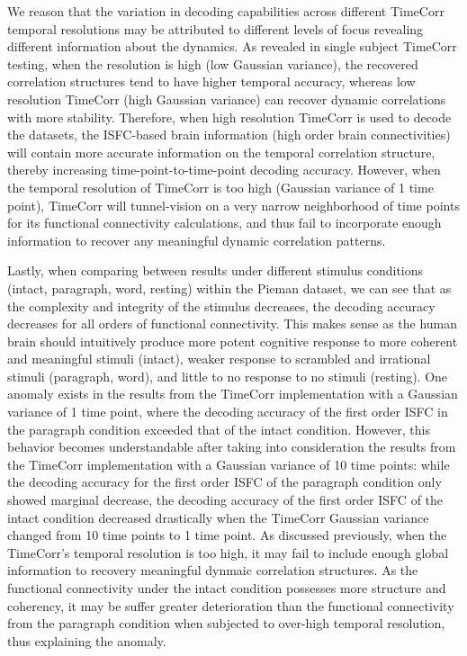 \documentclass[11pt]{article}
\begin{document}
We reason that the variation in decoding capabilities across different TimeCorr temporal resolutions may be attributed to different levels of focus revealing different information about the dynamics. As revealed in single subject TimeCorr testing, when the resolution is high (low Gaussian variance), the recovered correlation structures tend to have higher temporal accuracy, whereas low resolution TimeCorr (high Gaussian variance) can recover dynamic correlations with more stability. Therefore, when high resolution TimeCorr is used to decode the datasets, the ISFC-based brain information (high order brain connectivities) will contain more accurate information on the temporal correlation structure, thereby increasing time-point-to-time-point decoding accuracy. However, when the temporal resolution of TimeCorr is too high (Gaussian variance of 1 time point), TimeCorr will tunnel-vision on a very narrow neighborhood of time points for its functional connectivity calculations, and thus fail to incorporate enough information to recover any meaningful dynamic correlation patterns.

Lastly, when comparing between results under different stimulus conditions (intact, paragraph, word, resting) within the Pieman dataset, we can see that as the complexity and integrity of the stimulus decreases, the decoding accuracy decreases for all orders of functional connectivity. This makes sense as the human brain should intuitively produce more potent cognitive response to more coherent and meaningful stimuli (intact), weaker response to scrambled and irrational stimuli (paragraph, word), and little to no response to no stimuli (resting). One anomaly exists in the results from the TimeCorr implementation with a Gaussian variance of 1 time point, where the decoding accuracy of the first order ISFC in the paragraph condition exceeded that of the intact condition. However, this behavior becomes understandable after taking into consideration the results from the TimeCorr implementation with a Gaussian variance of 10 time points: while the decoding accuracy for the first order ISFC of the paragraph condition only showed marginal decrease, the decoding accuracy of the first order ISFC of the intact condition decreased drastically when the TimeCorr Gaussian variance changed from 10 time points to 1 time point. As discussed previously, when the TimeCorr's temporal resolution is too high, it may fail to include enough global information to recovery meaningful dynmaic correlation structures. As the functional connectivity under the intact condition possesses more structure and coherency, it may be suffer greater deterioration than the functional connectivity from the paragraph condition when subjected to over-high temporal resolution, thus explaining the anomaly.
\end{document}

